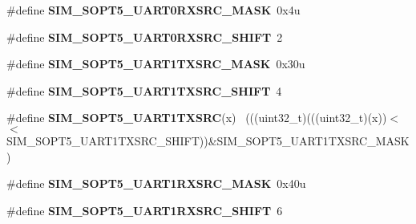 \begin{DoxyCompactItemize}
\item 
\hypertarget{group___s_i_m___register___masks_ga6160de3cd4b7169ac9095c0d0eee46f7}{}\#define {\bfseries S\+I\+M\+\_\+\+S\+O\+P\+T5\+\_\+\+U\+A\+R\+T0\+R\+X\+S\+R\+C\+\_\+\+M\+A\+S\+K}~0x4u\label{group___s_i_m___register___masks_ga6160de3cd4b7169ac9095c0d0eee46f7}

\item 
\hypertarget{group___s_i_m___register___masks_ga27e87f2f792b880bd156907ab20e9910}{}\#define {\bfseries S\+I\+M\+\_\+\+S\+O\+P\+T5\+\_\+\+U\+A\+R\+T0\+R\+X\+S\+R\+C\+\_\+\+S\+H\+I\+F\+T}~2\label{group___s_i_m___register___masks_ga27e87f2f792b880bd156907ab20e9910}

\item 
\hypertarget{group___s_i_m___register___masks_gac473b632c382f785d524c177ff186e0d}{}\#define {\bfseries S\+I\+M\+\_\+\+S\+O\+P\+T5\+\_\+\+U\+A\+R\+T1\+T\+X\+S\+R\+C\+\_\+\+M\+A\+S\+K}~0x30u\label{group___s_i_m___register___masks_gac473b632c382f785d524c177ff186e0d}

\item 
\hypertarget{group___s_i_m___register___masks_ga7714c11e5536dacc90fbc2960e532e94}{}\#define {\bfseries S\+I\+M\+\_\+\+S\+O\+P\+T5\+\_\+\+U\+A\+R\+T1\+T\+X\+S\+R\+C\+\_\+\+S\+H\+I\+F\+T}~4\label{group___s_i_m___register___masks_ga7714c11e5536dacc90fbc2960e532e94}

\item 
\hypertarget{group___s_i_m___register___masks_ga06c2c7dfca35c10b5c05598c2c29e944}{}\#define {\bfseries S\+I\+M\+\_\+\+S\+O\+P\+T5\+\_\+\+U\+A\+R\+T1\+T\+X\+S\+R\+C}(x)                                ~(((uint32\+\_\+t)(((uint32\+\_\+t)(x))$<$$<$S\+I\+M\+\_\+\+S\+O\+P\+T5\+\_\+\+U\+A\+R\+T1\+T\+X\+S\+R\+C\+\_\+\+S\+H\+I\+F\+T))\&S\+I\+M\+\_\+\+S\+O\+P\+T5\+\_\+\+U\+A\+R\+T1\+T\+X\+S\+R\+C\+\_\+\+M\+A\+S\+K)\label{group___s_i_m___register___masks_ga06c2c7dfca35c10b5c05598c2c29e944}

\item 
\hypertarget{group___s_i_m___register___masks_gaf34eb14baf5894693130af7addd8aa6f}{}\#define {\bfseries S\+I\+M\+\_\+\+S\+O\+P\+T5\+\_\+\+U\+A\+R\+T1\+R\+X\+S\+R\+C\+\_\+\+M\+A\+S\+K}~0x40u\label{group___s_i_m___register___masks_gaf34eb14baf5894693130af7addd8aa6f}

\item 
\hypertarget{group___s_i_m___register___masks_ga098fcb3123342f9cd96869c69d2fb7a9}{}\#define {\bfseries S\+I\+M\+\_\+\+S\+O\+P\+T5\+\_\+\+U\+A\+R\+T1\+R\+X\+S\+R\+C\+\_\+\+S\+H\+I\+F\+T}~6\label{group___s_i_m___register___masks_ga098fcb3123342f9cd96869c69d2fb7a9}


\end{DoxyCompactItemize}
